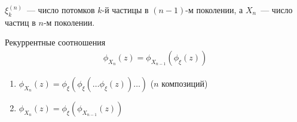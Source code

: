 \begin{note} $\xi_k^{(n)}$~--- число потомков $k$-й частицы в $(n - 1)$-м поколении, а $X_n$~--- число частиц в $n$-м поколении.
\end{note}

\begin{lemma} Рекуррентные соотношения
\begin{gather*}
    \phi_{X_n}(z) = \phi_{X_{n - 1}}(\phi_{\xi}(z))
\end{gather*}
\end{lemma}

\begin{corollary}
\begin{enumerate}
    \item $\phi_{X_n}(z) = \phi_{\xi}(\phi_{\xi}(\ldots\phi_{\xi}(z))\ldots)$ ($n$ композиций)
    \item $\phi_{X_n}(z) = \phi_{\xi}(\phi_{X_{n - 1}}(z))$
\end{enumerate}
\end{corollary}
